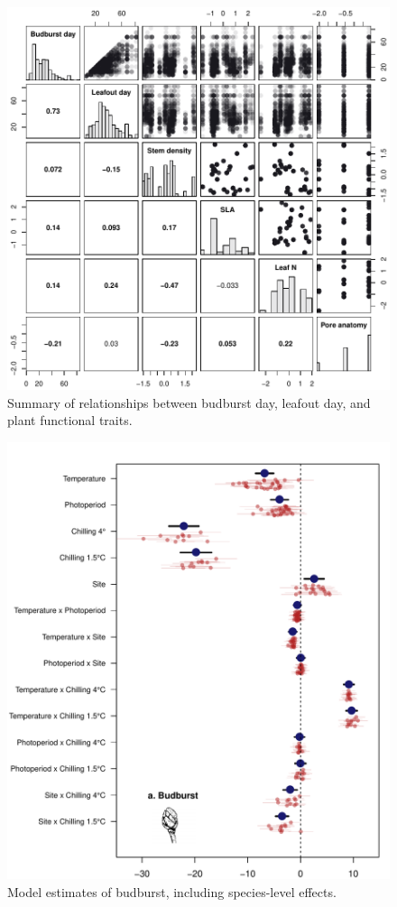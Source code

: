 \documentclass{article}
\begin{document}
\begin{figure}
\caption{Summary of relationships between budburst day, leafout day, and plant functional traits.}
\label{figS1}
\includegraphics[scale=0.75]{traitpairs}
\end{figure}

\begin{figure}
\caption{Model estimates of budburst, including species-level effects.}
\label{figS2}
\includegraphics[scale=0.75, page=1]{Fig1_bb_lo+sp}
\end{figure}
\end{document}
